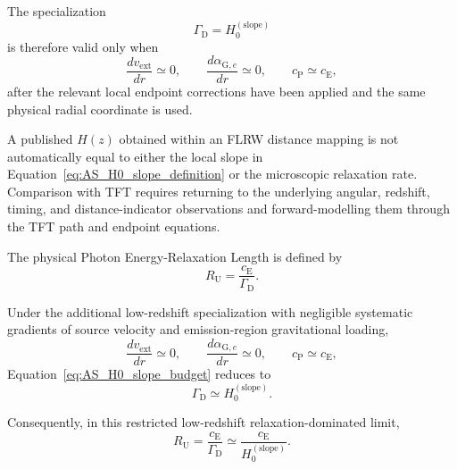 The specialization
\begin{equation}
    \boxed{
    \Gamma_{\mathrm D}
    =
    H_0^{(\mathrm{slope})}
    }
    \label{eq:AT_gamma_H0_specialization_exact}
\end{equation}
is therefore valid only when
\begin{equation}
    \frac{
        dv_{\mathrm{ext}}
    }{
        dr
    }
    \simeq
    0,
    \qquad
    \frac{
        d\alpha_{\mathrm G,e}
    }{
        dr
    }
    \simeq
    0,
    \qquad
    c_{\mathrm P}
    \simeq
    c_{\mathrm E},
    \label{eq:AS_gamma_H0_conditions}
\end{equation}
after the relevant local endpoint corrections have been applied and the same
physical radial coordinate is used.

A published
\(H(z)\)
obtained within an FLRW distance mapping is not automatically equal to either
the local slope in Equation~\eqref{eq:AS_H0_slope_definition} or the
microscopic relaxation rate. Comparison with TFT requires returning to the
underlying angular, redshift, timing, and distance-indicator observations and
forward-modelling them through the TFT path and endpoint equations.

The physical Photon Energy-Relaxation Length is defined by
\begin{equation}
    \boxed{
    R_{\mathrm U}
    =
    \frac{
        c_{\mathrm E}
    }{
        \Gamma_{\mathrm D}
    }.
    }
    \label{eq:AS_RU_physical_definition}
\end{equation}

Under the additional low-redshift specialization with negligible systematic
gradients of source velocity and emission-region gravitational loading,
\begin{equation}
    \frac{
        dv_{\mathrm{ext}}
    }{
        dr
    }
    \simeq
    0,
    \qquad
    \frac{
        d\alpha_{\mathrm G,e}
    }{
        dr
    }
    \simeq
    0,
    \qquad
    c_{\mathrm P}
    \simeq
    c_{\mathrm E},
\end{equation}
Equation~\eqref{eq:AS_H0_slope_budget} reduces to
\begin{equation}
    \boxed{
    \Gamma_{\mathrm D}
    \simeq
    H_0^{(\mathrm{slope})}.
    }
    \label{eq:AS_gamma_H0_specialization}
\end{equation}

Consequently, in this restricted low-redshift relaxation-dominated limit,
\begin{equation}
    \boxed{
    R_{\mathrm U}
    =
    \frac{
        c_{\mathrm E}
    }{
        \Gamma_{\mathrm D}
    }
    \simeq
    \frac{
        c_{\mathrm E}
    }{
        H_0^{(\mathrm{slope})}
    }.
    }
    \label{eq:AS_RU_H0_conditional}
\end{equation}

